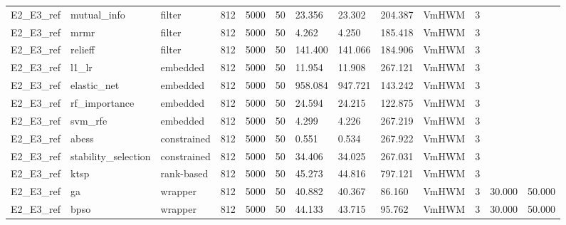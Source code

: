 \begin{table}[t]
\begin{tabular}{lllllllllllll}
    E2\_E3\_ref & mutual\_info & filter & 812 & 5000 & 50 & 23.356 & 23.302 & 204.387 & VmHWM & 3 &  &  \\
    E2\_E3\_ref & mrmr & filter & 812 & 5000 & 50 & 4.262 & 4.250 & 185.418 & VmHWM & 3 &  &  \\
    E2\_E3\_ref & relieff & filter & 812 & 5000 & 50 & 141.400 & 141.066 & 184.906 & VmHWM & 3 &  &  \\
    E2\_E3\_ref & l1\_lr & embedded & 812 & 5000 & 50 & 11.954 & 11.908 & 267.121 & VmHWM & 3 &  &  \\
    E2\_E3\_ref & elastic\_net & embedded & 812 & 5000 & 50 & 958.084 & 947.721 & 143.242 & VmHWM & 3 &  &  \\
    E2\_E3\_ref & rf\_importance & embedded & 812 & 5000 & 50 & 24.594 & 24.215 & 122.875 & VmHWM & 3 &  &  \\
    E2\_E3\_ref & svm\_rfe & embedded & 812 & 5000 & 50 & 4.299 & 4.226 & 267.219 & VmHWM & 3 &  &  \\
    E2\_E3\_ref & abess & constrained & 812 & 5000 & 50 & 0.551 & 0.534 & 267.922 & VmHWM & 3 &  &  \\
    E2\_E3\_ref & stability\_selection & constrained & 812 & 5000 & 50 & 34.406 & 34.025 & 267.031 & VmHWM & 3 &  &  \\
    E2\_E3\_ref & ktsp & rank-based & 812 & 5000 & 50 & 45.273 & 44.816 & 797.121 & VmHWM & 3 &  &  \\
    E2\_E3\_ref & ga & wrapper & 812 & 5000 & 50 & 40.882 & 40.367 & 86.160 & VmHWM & 3 & 30.000 & 50.000 \\
    E2\_E3\_ref & bpso & wrapper & 812 & 5000 & 50 & 44.133 & 43.715 & 95.762 & VmHWM & 3 & 30.000 & 50.000 \\
    \bottomrule
  \end{tabular}
\end{table}
